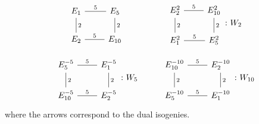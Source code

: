 \documentclass[11pt]{article}
\theoremstyle{definition}
\begin{document}
%
\[ 
\begin{tikzcd}
E_1 \arrow[dash]{r}{5} 
    \arrow[dash]{d}{2} & 
    E_{5}  \arrow[dash]{d}{2} \\
 E_2 \arrow[dash]{r}{5} & E_{10}   
\end{tikzcd}
\phantom{\colon W_2}
\hskip 1truecm
\begin{tikzcd}
E_2^2 \arrow[dash]{r}{5} 
    \arrow[dash]{d}{2} & 
    E_{10}^2  \arrow[dash]{d}{2} \\
 E_1^2 \arrow[dash]{r}{5} & E_{5}^2   
\end{tikzcd}
\colon W_2
\]

\[ 
\begin{tikzcd}
E_{5}^{-5} \arrow[dash]{r}{5} 
    \arrow[dash]{d}{2} & 
    E_1^{-5}  \arrow[dash]{d}{2} \\
 E_{10}^{-5} \arrow[dash]{r}{5} & E_2^{-5}   
\end{tikzcd} \colon W_5
\hskip 1truecm
\begin{tikzcd}
E_{10}^{-10} \arrow[dash]{r}{5} 
    \arrow[dash]{d}{2} & 
    E_2^{-10}  \arrow[dash]{d}{2} \\
 E_{5}^{-10} \arrow[dash]{r}{5} & E_1^{-10} 
\end{tikzcd}
\colon W_{10}
\]
where the  
arrows correspond to the dual isogenies.
\end{document}
